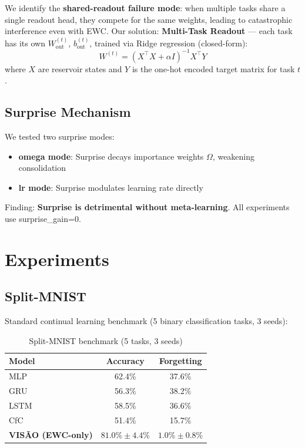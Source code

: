 \documentclass[11pt,a4paper]{article}
\begin{document}
We identify the \textbf{shared-readout failure mode}: when multiple tasks share a single readout head, they compete for the same weights, leading to catastrophic interference even with EWC.
Our solution: \textbf{Multi-Task Readout} --- each task has its own $W_{\text{out}}^{(t)}$, $b_{\text{out}}^{(t)}$, trained via Ridge regression (closed-form):
\begin{equation}
    W^{(t)} = (X^\top X + \alpha I)^{-1} X^\top Y
\end{equation}
where $X$ are reservoir states and $Y$ is the one-hot encoded target matrix for task $t$.

\subsection{Surprise Mechanism}

We tested two surprise modes:
\begin{itemize}
    \item \textbf{omega mode}: Surprise decays importance weights $\Omega$, weakening consolidation
    \item \textbf{lr mode}: Surprise modulates learning rate directly
\end{itemize}

Finding: \textbf{Surprise is detrimental without meta-learning}. All experiments use surprise\_gain=0.

\section{Experiments}

\subsection{Split-MNIST}

Standard continual learning benchmark (5 binary classification tasks, 3 seeds):

\begin{table}[H]
\centering
\begin{tabular}{lcc}
\toprule
\textbf{Model} & \textbf{Accuracy} & \textbf{Forgetting} \\
\midrule
MLP & 62.4\% & 37.6\% \\
GRU & 56.3\% & 38.2\% \\
LSTM & 58.5\% & 36.6\% \\
CfC & 51.4\% & 15.7\% \\
\textbf{VISÃO (EWC-only)} & $\mathbf{81.0\% \pm 4.4\%}$ & $\mathbf{1.0\% \pm 0.8\%}$ \\
\bottomrule
\end{tabular}
\caption{Split-MNIST benchmark (5 tasks, 3 seeds)}
\label{tab:splitmnist}
\end{table}
\end{document}
